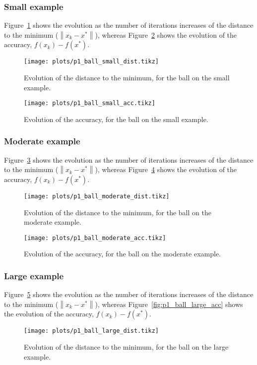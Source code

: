 \documentclass[final]{aomart}
\newcommand{\xk}{x_k}
\newcommand{\xopt}{x^*}
\newtheorem[{}\it]{thm}{Theorem}[section]
\theoremstyle{definition}
\newtheorem*[{}\it]{notation}{Notation}
\numberwithin{equation}{section}
\newcommand{\enVert}[1]{\left\lVert#1\right\rVert}
\let\norm=\enVert
\begin{document}
\subsubsection{Small example}
Figure~\ref{fig:p1_ball_small_dist} shows the evolution as the number of iterations increases of the distance to the minimum (\(\norm{\xk - \xopt}\)), whereas Figure~\ref{fig:p1_ball_small_acc} shows the evolution of the accuracy, \(f(\xk) - f(\xopt)\).
\begin{figure}[!hbtp]
	\centering
	\texttt{[image: plots/p1\_ball\_small\_dist.tikz]}
	\caption{Evolution of the distance to the minimum, for the ball on the small example.}
	\label{fig:p1_ball_small_dist}
\end{figure}

\begin{figure}[!hbtp]
	\centering
	\texttt{[image: plots/p1\_ball\_small\_acc.tikz]}
	\caption{Evolution of the accuracy, for the ball on the small example.}
	\label{fig:p1_ball_small_acc}
\end{figure}

\subsubsection{Moderate example}
Figure~\ref{fig:p1_ball_moderate_dist} shows the evolution as the number of iterations increases of the distance to the minimum (\(\norm{\xk - \xopt}\)), whereas Figure~\ref{fig:p1_ball_moderate_acc} shows the evolution of the accuracy, \(f(\xk) - f(\xopt)\).
\begin{figure}[!hbtp]
	\centering
	\texttt{[image: plots/p1\_ball\_moderate\_dist.tikz]}
	\caption{Evolution of the distance to the minimum, for the ball on the moderate example.}
	\label{fig:p1_ball_moderate_dist}
\end{figure}

\begin{figure}[!hbtp]
	\centering
	\texttt{[image: plots/p1\_ball\_moderate\_acc.tikz]}
	\caption{Evolution of the accuracy, for the ball on the moderate example.}
	\label{fig:p1_ball_moderate_acc}
\end{figure}

\subsubsection{Large example}
Figure~\ref{fig:p1_ball_large_dist} shows the evolution as the number of iterations increases of the distance to the minimum (\(\norm{\xk - \xopt}\)), whereas Figure~\ref{fig:p1_ball_large_acc} shows the evolution of the accuracy, \(f(\xk) - f(\xopt)\).
\begin{figure}[!hbtp]
	\centering
	\texttt{[image: plots/p1\_ball\_large\_dist.tikz]}
	\caption{Evolution of the distance to the minimum, for the ball on the large example.}
	\label{fig:p1_ball_large_dist}
\end{figure}
\end{document}
